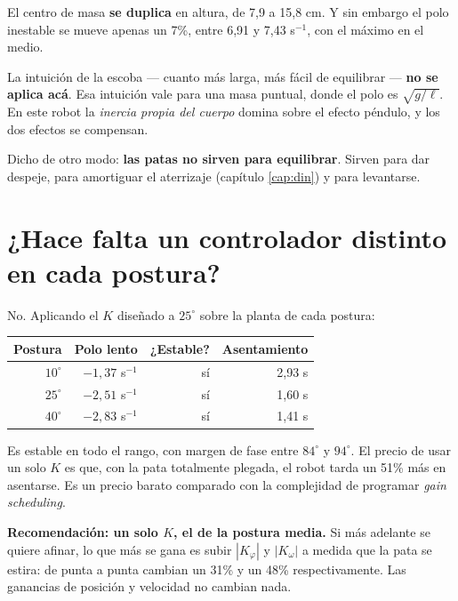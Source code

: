 \documentclass[11pt,a4paper]{report}
\begin{document}
El centro de masa \textbf{se duplica} en altura, de 7{,}9 a 15{,}8 cm. Y sin embargo el polo
inestable se mueve apenas un 7\%, entre 6{,}91 y 7{,}43 s$^{-1}$, con el máximo en el medio.

\begin{idea}
La intuición de la escoba --- cuanto más larga, más fácil de equilibrar --- \textbf{no se
aplica acá}. Esa intuición vale para una masa puntual, donde el polo es $\sqrt{g/\ell}$. En
este robot la \emph{inercia propia del cuerpo} domina sobre el efecto péndulo, y los dos
efectos se compensan.

Dicho de otro modo: \textbf{las patas no sirven para equilibrar}. Sirven para dar despeje,
para amortiguar el aterrizaje (capítulo \ref{cap:din}) y para levantarse.
\end{idea}

\section{¿Hace falta un controlador distinto en cada postura?}

No. Aplicando el $K$ diseñado a $25^\circ$ sobre la planta de cada postura:

\begin{center}
\begin{tabular}{@{}rrrr@{}}
\toprule
\textbf{Postura} & \textbf{Polo lento} & \textbf{¿Estable?} & \textbf{Asentamiento} \\
\midrule
$10^\circ$ & $-1{,}37$ s$^{-1}$ & sí & 2{,}93 s \\
$25^\circ$ & $-2{,}51$ s$^{-1}$ & sí & 1{,}60 s \\
$40^\circ$ & $-2{,}83$ s$^{-1}$ & sí & 1{,}41 s \\
\bottomrule
\end{tabular}
\end{center}

Es estable en todo el rango, con margen de fase entre $84^\circ$ y $94^\circ$. El precio de
usar un solo $K$ es que, con la pata totalmente plegada, el robot tarda un 51\% más en
asentarse. Es un precio barato comparado con la complejidad de programar \emph{gain
scheduling}.

\begin{idea}
\textbf{Recomendación: un solo $K$, el de la postura media.} Si más adelante se quiere afinar,
lo que más se gana es subir $|K_\varphi|$ y $|K_\omega|$ a medida que la pata se estira: de
punta a punta cambian un 31\% y un 48\% respectivamente. Las ganancias de posición y velocidad
no cambian nada.
\end{idea}
\end{document}

